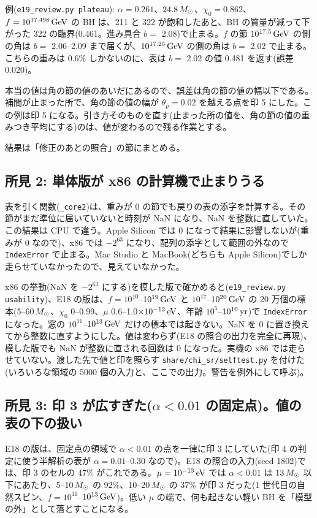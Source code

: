 例(\texttt{e19\_review.py plateau}): $\alpha=0.261$、$24.8\,M_\odot$、$\chi_0=0.862$、$f=10^{17.498}\,\mathrm{GeV}$ の BH は、211 と 322 が飽和したあと、BH の質量が減って下がった 322 の臨界(0.461。進み具合 $b=$ 2.08)で止まる。$f$ の節 $10^{17.5}\,\mathrm{GeV}$ の側の角は $b=$ 2.06--2.09 まで届くが、$10^{17.25}\,\mathrm{GeV}$ の側の角は $b=$ 2.02 で止まる。こちらの重みは 0.6\% しかないのに、表は $b=$ 2.02 の値 0.481 を返す(誤差 0.020)。

本当の値は角の節の値のあいだにあるので、誤差は角の節の値の幅以下である。補間が止まった所で、角の節の値の幅が $\theta_p=0.02$ を越える点を印 5 にした。この例は印 5 になる。引き方そのものを直す(止まった所の値を、角の節の値の重みつき平均にする)のは、値が変わるので残る作業とする。

結果は「修正のあとの照合」の節にまとめる。

\subsection{所見 2: 単体版が x86 の計算機で止まりうる}

表を引く関数(\texttt{\_core2})は、重みが 0 の節でも戻りの表の添字を計算する。その節がまだ準位に届いていないと時刻が NaN になり、NaN を整数に直していた。この結果は CPU で違う。Apple Silicon では 0 になって結果に影響しないが(重みが 0 なので)、x86 では $-2^{63}$ になり、配列の添字として範囲の外なので \texttt{IndexError} で止まる。Mac Studio と MacBook(どちらも Apple Silicon)でしか走らせていなかったので、見えていなかった。

x86 の挙動(NaN を $-2^{63}$ にする)を模した版で確かめると(\texttt{e19\_review.py usability})、E18 の版は、$f=10^{10}$--$10^{19}\,\mathrm{GeV}$ と $10^{17}$--$10^{20}\,\mathrm{GeV}$ の 20 万個の標本(5--60$\,M_\odot$、$\chi_0$ 0--0.99、$\mu$ 0.6--1.0$\times10^{-12}\,\mathrm{eV}$、年齢 $10^5$--$10^{10}\,\mathrm{yr}$)で \texttt{IndexError} になった。窓の $10^{11}$--$10^{13}\,\mathrm{GeV}$ だけの標本では起きない。NaN を 0 に置き換えてから整数に直すようにした。値は変わらず(E18 の照合の出力を完全に再現)、模した版でも NaN が整数に直される回数は 0 になった。実機の x86 では走らせていない。渡した先で値と印を照らす \texttt{share/chi\_sr/selftest.py} を付けた(いろいろな領域の 5000 個の入力と、ここでの出力。警告を例外にして呼ぶ)。

\subsection{所見 3: 印 3 が広すぎた($\alpha<0.01$ の固定点)。値の表の下の扱い}

E18 の版は、固定点の領域で $\alpha<0.01$ の点を一律に印 3 にしていた(印 4 の判定に使う半解析の表が $\alpha=0.01$--0.30 なので)。E18 の照合の入力(seed 1802)では、印 3 のセルの 47\% がこれである。$\mu=10^{-13}\,\mathrm{eV}$ では $\alpha<0.01$ は $13\,M_\odot$ 以下にあたり、5--10$\,M_\odot$ の 92\%、10--20$\,M_\odot$ の 37\% が印 3 だった(1 世代目の自然スピン、$f=10^{11}$--$10^{13}\,\mathrm{GeV}$)。低い $\mu$ の端で、何も起きない軽い BH を「模型の外」として落とすことになる。

